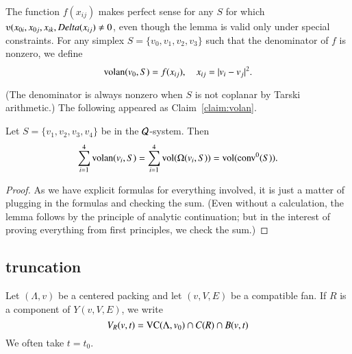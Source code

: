 \begin{definition}[volan]\label{def:volan}
The function $f(x_{ij})$ makes perfect sense for any $S$ for which $\ups(x_{0i},x_{0j},x_{ik},\Delta(x_{ij})\ne 0$,
even though the lemma is valid only under special constraints.
For any simplex $S=\{v_0,v_1,v_2,v_3\}$ such that the denominator of $f$ is nonzero, we define
$$
{\operatorname{volan}}(v_0,S) = f(x_{ij}),\quad x_{ij} = |v_i-v_j|^2.
$$  
\end{definition}

(The denominator is always nonzero when $S$ is not coplanar by Tarski arithmetic.)
The following appeared as Claim~\ref{claim:volan}.


\begin{lemma}  %
Let $S=\{v_1,v_2,v_3,v_4\}$ be in the ${\mathcal Q}$-system. Then
    $$
    \sum_{i=1}^4 {\operatorname{volan}}(v_i,S) = \sum_{i=1}^4
    {\operatorname{vol}}(\Omega(v_i,S)) = {\operatorname{vol}}({\operatorname{conv}}^0(S)).
    $$
\end{lemma}

\begin{proof} As we have explicit formulas for everything involved,
it is just a matter of plugging in the formulas and checking the sum.
(Even without a calculation, the lemma follows by the principle of analytic continuation;
but in the interest of proving everything from first principles, we
check the sum.)
\end{proof}

\subsection{truncation}

Let $(\Lambda,v)$ be a centered packing and let $(v,V,E)$ be a compatible
fan.
If $R$ is a component of $Y(v,V,E)$, we write 
  $$
  V_R(v,t) = {\operatorname{VC}}(\Lambda,v_0)\cap C(R)\cap B(v,t)
  $$
We often
take $t=t_0$.



